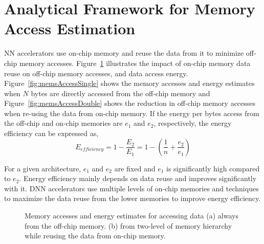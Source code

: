 \documentclass[a4paper,10pt]{article}
\begin{document}
\section{Analytical Framework for Memory Access Estimation}\label{AnalyticalFramework}
NN accelerators use on-chip memory and reuse the data from it to minimize off-chip memory accesses. Figure~\ref{fig:memsAccess} illustrates the impact of on-chip memory data reuse on off-chip memory accesses, and data access energy. Figure~\ref{fig:memsAccessSingle} shows the memory accesses and energy estimates when $N$ bytes are directly accessed from the off-chip memory and Figure~\ref{fig:memsAccessDouble} shows the reduction in off-chip memory accesses when re-using the data from on-chip memory. If the energy per bytes access from the off-chip and on-chip memories are $e_{1}$ and $e_{2}$, respectively, the energy efficiency can be expressed as, 
\begin{equation}\label{e_efficiency}
	E_{efficiency}=1-\frac{E_2}{E_1}=1-(\frac{1}{n}+\frac{e_{2}}{e_{1}})
\end{equation}

For a given architecture, $e_{1}$ and $e_{2}$ are fixed and $e_1$ is significantly high compared to $e_2$. Energy efficiency mainly depends on data reuse and improves significantly with it. DNN accelerators use multiple levels of on-chip memories and techniques to maximize the data reuse from the lower memories to improve energy efficiency. 
\begin{figure}[!htb]
	\centering
    \captionsetup{font=sf}
	\hfil	
	\hfil	
	\caption{Memory accesses and energy estimates for accessing data (a) always from the off-chip memory. (b) from two-level of memory hierarchy while reusing the data from on-chip memory.}
	\label{fig:memsAccess}
\end{figure}
\end{document}
